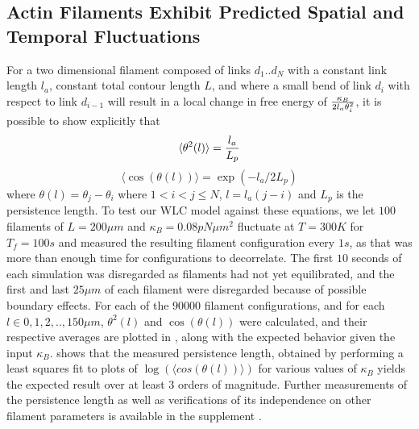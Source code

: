 \documentclass[12pt]{article}
\begin{document}
\subsection{Actin Filaments Exhibit Predicted Spatial and Temporal Fluctuations}
For a two dimensional filament composed of links $d_1..d_N$ with a constant link length $l_a$, constant total contour
length $L$, and where a small bend of link
$d_i$ with respect to link $d_{i-1}$ will result in a local change in free energy of ${\kappa_B\over2l_a\theta_i^2}$, it
is possible to show explicitly that \cite{frontali1979}
\begin{equation}
  \langle\theta^2(l)\rangle = {l_a\over L_p}
  \label{eqn:thsq}
\end{equation}
\begin{equation} 
  \langle\cos(\theta(l))\rangle = \exp{(-l_a/2L_p)}
  \label{eqn:costh}
\end{equation} 
where $\theta(l) = \theta_j - \theta_i$ where $1<i<j\le N$, $l = l_a(j-i)$ and $L_p$ is the persistence length. 
To test our WLC model against these equations, we let $100$ filaments of $L=200\mu m$ and $\kappa_B=0.08 pN\mu m^2$ fluctuate at
$T=300K$ for $T_f = 100s$ and measured the resulting filament configuration every $1s$, as that was more than enough
time for configurations to decorrelate. The first $10$ seconds of each simulation was disregarded as filaments had not
yet equilibrated, and the first and last $25\mu m$ of each filament were disregarded because of possible boundary
effects. 
For each of the $90000$ filament configurations, and for each $l\in{0,1,2,..,150}\mu m$,
$\theta^2(l)$ and $\cos(\theta(l))$ were calculated, and their respective averages are plotted in 
, along with the expected behavior given the input $\kappa_B$.   shows that the
measured persistence length, obtained by performing a least squares fit to plots of
 $\log{(\langle cos(\theta(l))\rangle )} $
 for various values of $\kappa_B$ yields the expected result over at least $3$
orders of magnitude. Further measurements of the persistence length as well as verifications of its independence on
other filament parameters is available in the supplement .
\end{document}
